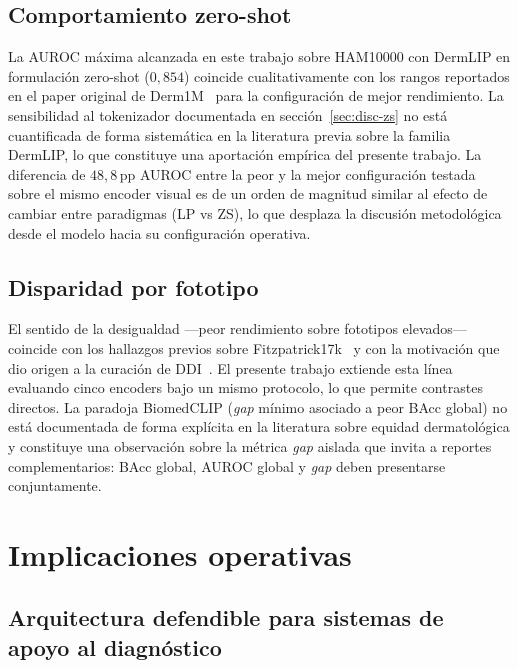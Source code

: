 \subsection{Comportamiento zero-shot}
\label{sec:lit-zs}

La AUROC máxima alcanzada en este trabajo sobre HAM10000 con
DermLIP en formulación zero-shot ($0{,}854$) coincide
cualitativamente con los rangos reportados en el paper original de
Derm1M~\cite{derm1m} para la configuración de mejor rendimiento.
La sensibilidad al tokenizador documentada en
secci\'on~\ref{sec:disc-zs} no está cuantificada de forma sistemática en
la literatura previa sobre la familia DermLIP, lo que constituye
una aportación empírica del presente trabajo. La diferencia de
$48{,}8$\,pp AUROC entre la peor y la mejor configuración
testada sobre el mismo encoder visual es de un orden de magnitud
similar al efecto de cambiar entre paradigmas (LP vs ZS), lo que
desplaza la discusión metodológica desde el modelo hacia su
configuración operativa.

\subsection{Disparidad por fototipo}
\label{sec:lit-equidad}

El sentido de la desigualdad ---peor rendimiento sobre fototipos
elevados--- coincide con los hallazgos previos sobre
Fitzpatrick17k~\cite{fitzpatrick17k} y con la motivación que dio
origen a la curación de DDI~\cite{ddi}. El presente trabajo
extiende esta línea evaluando cinco encoders bajo un mismo
protocolo, lo que permite contrastes directos. La paradoja
BiomedCLIP (\emph{gap} mínimo asociado a peor BAcc global) no está
documentada de forma explícita en la literatura sobre equidad
dermatológica y constituye una observación sobre la métrica
\emph{gap} aislada que invita a reportes complementarios: BAcc
global, AUROC global y \emph{gap} deben presentarse conjuntamente.

\section{Implicaciones operativas}
\label{sec:implicaciones}

\subsection{Arquitectura defendible para sistemas de apoyo al diagnóstico}
\label{sec:disc-arq}


